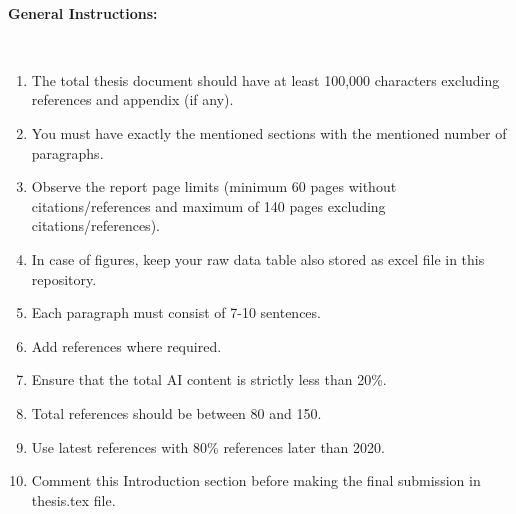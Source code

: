 \newpage

\thispagestyle{empty}

\begin{large}

\vspace*{6cm}

\

\large{ \textbf{General Instructions:} }

\

\noindent
\begin{enumerate}
\item The total thesis document should have at least 100,000 characters excluding references and appendix (if any).
\item You must have exactly the mentioned sections with the mentioned number of paragraphs.
\item Observe the report page limits (minimum 60 pages without citations/references and maximum of 140 pages excluding citations/references). 
\item In case of figures, keep your raw data table also stored as excel file in this repository.
\item Each paragraph must consist of 7-10 sentences.
\item Add references where required.
\item Ensure that the total AI content is strictly less than 20\%.
\item Total references should be between 80 and 150.
\item Use latest references with 80\% references later than 2020.
\item Comment this Introduction section before making the final submission in thesis.tex file.
\end{enumerate}

\end{large}
